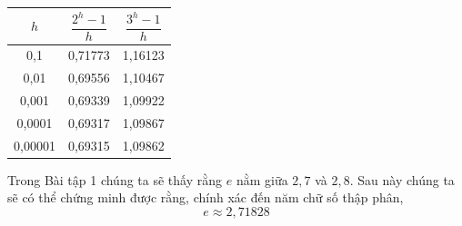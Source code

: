 \noindent
\begin{minipage}[t]{0.27\textwidth}
    \setlength{\tabcolsep}{3.5pt}
    \renewcommand{\arraystretch}{1.25}
    \centering
    \fontsize{8.5pt}{11pt}\selectfont
    \begin{tabular}{|c|c|c|}
        \hline
        \rowcolor{tableheader}
        \rule{0pt}{14pt}$h$ & $\dfrac{2^h - 1}{h}$ & $\dfrac{3^h - 1}{h}$ \\[6pt]
        \hline
        0{,}1     & 0{,}71773 & 1{,}16123 \\
        0{,}01    & 0{,}69556 & 1{,}10467 \\
        0{,}001   & 0{,}69339 & 1{,}09922 \\
        0{,}0001  & 0{,}69317 & 1{,}09867 \\
        0{,}00001 & 0{,}69315 & 1{,}09862 \\
        \hline
    \end{tabular}

    \vspace{4.6cm}
    \raggedright
    \fontsize{8.5pt}{11.5pt}\selectfont
    Trong Bài tập 1 chúng ta sẽ thấy rằng $e$ nằm giữa $2{,}7$ và $2{,}8$. Sau này chúng ta sẽ có thể chứng minh được rằng, chính xác đến năm chữ số thập phân,
    \[
        e \approx 2{,}71828
    \]
\end{minipage}%
\hfill
